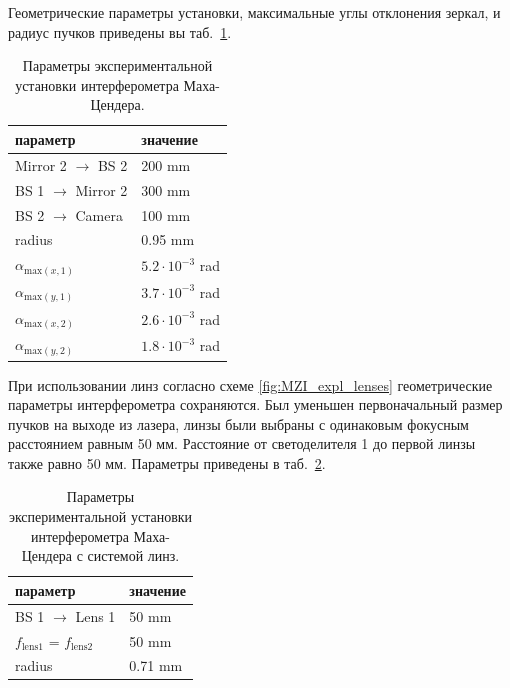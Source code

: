 Геометрические параметры установки, максимальные углы отклонения зеркал, и радиус пучков приведены вы таб.~\ref{tab:MZI_params}. 

\begin{table} [htbp]
    \centering
    \begin{threeparttable}
        \caption{Параметры экспериментальной установки интерферометра Маха-Цендера.}\label{tab:MZI_params}
        \begin{tabular}{| p{5cm} || p{5cm} |}
            \hline
            \hline
            параметр & значение \\
            \hline
            Mirror 2 $\to$ BS 2 & 200 mm\\
            BS 1 $\to$ Mirror 2 & 300 mm\\
            BS 2 $\to$ Camera & 100 mm\\
            radius & 0.95 mm\\
            $\alpha_{{\mathrm{max}}(x,1)}$ & $5.2 \cdot 10^{-3}$ rad\\
            $\alpha_{{\mathrm{max}}(y,1)}$ & $3.7 \cdot 10^{-3}$ rad\\
            $\alpha_{{\mathrm{max}}(x,2)}$ & $2.6 \cdot 10^{-3}$ rad\\
            $\alpha_{{\mathrm{max}}(y,2)}$ & $1.8 \cdot 10^{-3}$ rad\\
            \hline
            \hline
        \end{tabular}
    \end{threeparttable}
\end{table}

При использовании линз согласно схеме \ref{fig:MZI_expl_lenses} геометрические параметры интерферометра сохраняются. Был уменьшен первоначальный размер пучков на выходе из лазера, линзы были выбраны с одинаковым фокусным расстоянием равным 50 мм. Расстояние от светоделителя 1 до первой линзы также равно 50 мм. Параметры приведены в таб.~\ref{tab:MZI_lens_params}. 

\begin{table} [htbp]
    \centering
    \begin{threeparttable}
        \caption{Параметры экспериментальной установки интерферометра Маха-Цендера с системой линз.}\label{tab:MZI_lens_params}
        \begin{tabular}{| p{5cm} || p{5cm} |}
            \hline
            \hline
            параметр & значение \\
            \hline
            BS 1 $\to$ Lens 1 & 50 mm\\
            $f_{\mathrm{lens 1}}$ = $f_{\mathrm{lens 2}}$ & 50 mm\\
            radius & 0.71 mm\\
            \hline
            \hline
        \end{tabular}
    \end{threeparttable}
\end{table}

